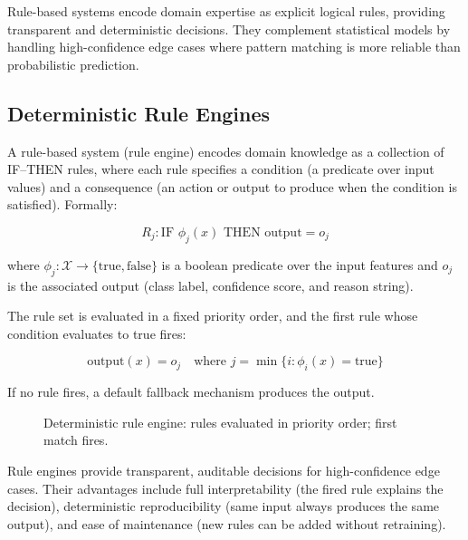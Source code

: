 \documentclass[10pt,a4paper]{article}
\begin{document}
Rule-based systems encode domain expertise as explicit logical rules, providing transparent and deterministic decisions. They complement statistical models by handling high-confidence edge cases where pattern matching is more reliable than probabilistic prediction.

\subsection{Deterministic Rule Engines}
\label{sec:rule-engines}

A rule-based system (rule engine) encodes domain knowledge as a collection of IF--THEN rules, where each rule specifies a condition (a predicate over input values) and a consequence (an action or output to produce when the condition is satisfied). Formally:

\begin{equation}
R_j: \text{IF } \phi_j(x) \text{ THEN } \text{output} = o_j
\label{eq:rule-structure}
\end{equation}

where $\phi_j: \mathcal{X} \to \{\text{true}, \text{false}\}$ is a boolean predicate over the input features and $o_j$ is the associated output (class label, confidence score, and reason string).

The rule set is evaluated in a fixed priority order, and the first rule whose condition evaluates to true fires:

\begin{equation}
\text{output}(x) = o_j \quad \text{where } j = \min\{i : \phi_i(x) = \text{true}\}
\label{eq:rule-eval}
\end{equation}

If no rule fires, a default fallback mechanism produces the output.

\begin{figure}[H]
    \centering
    \caption{Deterministic rule engine: rules evaluated in priority order; first match fires.}
    \label{fig:rule-engine-flow}
\end{figure}

Rule engines provide transparent, auditable decisions for high-confidence edge cases. Their advantages include full interpretability (the fired rule explains the decision), deterministic reproducibility (same input always produces the same output), and ease of maintenance (new rules can be added without retraining).
\end{document}
